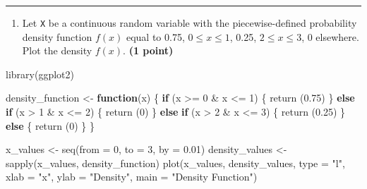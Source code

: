 \documentclass[
]{article}
\newenvironment{Shaded}{\begin{snugshade}}{\end{snugshade}}
\newcommand{\AttributeTok}[1]{\textcolor[rgb]{0.77,0.63,0.00}{#1}}
\newcommand{\ControlFlowTok}[1]{\textcolor[rgb]{0.13,0.29,0.53}{\textbf{#1}}}
\newcommand{\DecValTok}[1]{\textcolor[rgb]{0.00,0.00,0.81}{#1}}
\newcommand{\FloatTok}[1]{\textcolor[rgb]{0.00,0.00,0.81}{#1}}
\newcommand{\FunctionTok}[1]{\textcolor[rgb]{0.00,0.00,0.00}{#1}}
\newcommand{\NormalTok}[1]{#1}
\newcommand{\OtherTok}[1]{\textcolor[rgb]{0.56,0.35,0.01}{#1}}
\newcommand{\SpecialCharTok}[1]{\textcolor[rgb]{0.00,0.00,0.00}{#1}}
\newcommand{\StringTok}[1]{\textcolor[rgb]{0.31,0.60,0.02}{#1}}
\providecommand{\tightlist}{%
  \setlength{\itemsep}{0pt}\setlength{\parskip}{0pt}}
\begin{document}
\begin{center}\rule{0.5\linewidth}{0.5pt}\end{center}

\begin{enumerate}
\def\labelenumi{\arabic{enumi}.}
\setcounter{enumi}{5}
\tightlist
\item
  Let \texttt{X} be a continuous random variable with the
  piecewise-defined probability density function \(f(x)\) equal to 0.75,
  \(0≤x≤1\), 0.25, \(2≤x≤3\), 0 elsewhere. Plot the density \(f(x)\).
  \textbf{(1 point)}
\end{enumerate}

\begin{Shaded}
\begin{Highlighting}[]

\FunctionTok{library}\NormalTok{(ggplot2)}

\NormalTok{density\_function }\OtherTok{\textless{}{-}} \ControlFlowTok{function}\NormalTok{(x) \{}
  \ControlFlowTok{if}\NormalTok{ (x }\SpecialCharTok{\textgreater{}=} \DecValTok{0} \SpecialCharTok{\&}\NormalTok{ x }\SpecialCharTok{\textless{}=} \DecValTok{1}\NormalTok{) \{}
    \FunctionTok{return}\NormalTok{ (}\FloatTok{0.75}\NormalTok{)}
\NormalTok{  \} }\ControlFlowTok{else} \ControlFlowTok{if}\NormalTok{ (x }\SpecialCharTok{\textgreater{}} \DecValTok{1} \SpecialCharTok{\&}\NormalTok{ x }\SpecialCharTok{\textless{}=} \DecValTok{2}\NormalTok{) \{}
    \FunctionTok{return}\NormalTok{ (}\DecValTok{0}\NormalTok{)}
\NormalTok{  \} }\ControlFlowTok{else} \ControlFlowTok{if}\NormalTok{ (x }\SpecialCharTok{\textgreater{}} \DecValTok{2} \SpecialCharTok{\&}\NormalTok{ x }\SpecialCharTok{\textless{}=} \DecValTok{3}\NormalTok{) \{}
    \FunctionTok{return}\NormalTok{ (}\FloatTok{0.25}\NormalTok{)}
\NormalTok{  \} }\ControlFlowTok{else}\NormalTok{ \{}
    \FunctionTok{return}\NormalTok{ (}\DecValTok{0}\NormalTok{)}
\NormalTok{  \}}
\NormalTok{\}}

\NormalTok{x\_values }\OtherTok{\textless{}{-}} \FunctionTok{seq}\NormalTok{(}\AttributeTok{from =} \DecValTok{0}\NormalTok{, }\AttributeTok{to =} \DecValTok{3}\NormalTok{, }\AttributeTok{by =} \FloatTok{0.01}\NormalTok{)}
\NormalTok{density\_values }\OtherTok{\textless{}{-}} \FunctionTok{sapply}\NormalTok{(x\_values, density\_function)}
\FunctionTok{plot}\NormalTok{(x\_values, density\_values, }\AttributeTok{type =} \StringTok{"l"}\NormalTok{, }\AttributeTok{xlab =} \StringTok{"x"}\NormalTok{, }\AttributeTok{ylab =} \StringTok{"Density"}\NormalTok{, }\AttributeTok{main =} \StringTok{"Density Function"}\NormalTok{)}
\end{Highlighting}
\end{Shaded}
\end{document}
